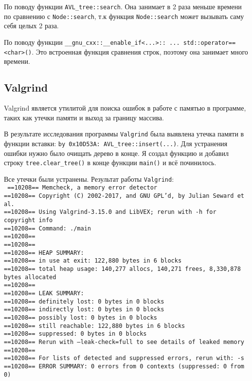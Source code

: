 \documentclass[12pt]{article}
\begin{document}
По поводу функции \texttt{AVL\_tree::search}. Она занимает в 2 раза меньше времени по сравнению с \texttt{Node::search}, т.к функция \texttt{Node::search} может вызывать саму себя целых 2 раза.

По поводу функции \texttt{\_\_gnu\_cxx::\_\_enable\_if<...>:: ... std::operator==<char>()}. Это встроенная функция сравнения строк, поэтому она занимает много времени.

\subsection*{Valgrind}

Valgrind является утилитой для поиска ошибок в работе с памятью в программе, таких
как утечки памяти и выход за границу массива.

В результате исследования программы \texttt{Valgrind} была выявлена утечка памяти в функции вставки: \texttt{by 0x10D53A: AVL\_tree::insert(...)}.
Для устранения ошибки нужно было очищать дерево в конце. Я создал функцию и добавил строку \texttt{tree.clear\_tree()} в конце функции \texttt{main()} и всё починилось.

Все утечки были устранены. Результат работы \texttt{Valgrind}: \\
\texttt{
    ==10208== Memcheck, a memory error detector \\
    ==10208== Copyright (C) 2002-2017, and GNU GPL'd, by Julian Seward et al.\\
    ==10208== Using Valgrind-3.15.0 and LibVEX; rerun with -h for copyright info\\
    ==10208== Command: ./main\\
    ==10208== \\
    ==10208== \\
    ==10208== HEAP SUMMARY:\\
    ==10208==     in use at exit: 122,880 bytes in 6 blocks\\
    ==10208==   total heap usage: 140,277 allocs, 140,271 frees, 8,330,878 bytes allocated\\
    ==10208== \\
    ==10208== LEAK SUMMARY:\\
    ==10208==    definitely lost: 0 bytes in 0 blocks\\
    ==10208==    indirectly lost: 0 bytes in 0 blocks\\
    ==10208==      possibly lost: 0 bytes in 0 blocks\\
    ==10208==    still reachable: 122,880 bytes in 6 blocks\\
    ==10208==         suppressed: 0 bytes in 0 blocks\\
    ==10208== Rerun with --leak-check=full to see details of leaked memory\\
    ==10208== \\
    ==10208== For lists of detected and suppressed errors, rerun with: -s\\
    ==10208== ERROR SUMMARY: 0 errors from 0 contexts (suppressed: 0 from 0)\\
}
\end{document}
